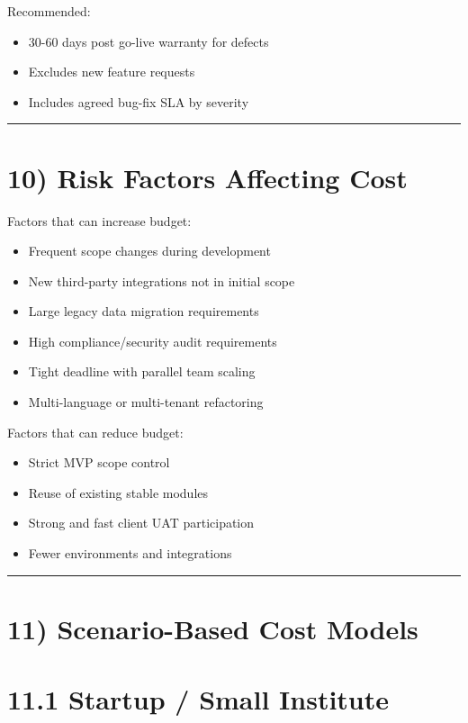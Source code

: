 \documentclass[11pt,a4paper]{article}
\begin{document}
Recommended:\\

\begin{itemize}
\item 30-60 days post go-live warranty for defects
\item Excludes new feature requests
\item Includes agreed bug-fix SLA by severity
\end{itemize}

\bigskip\hrule\bigskip

\section{10) Risk Factors Affecting Cost}

Factors that can increase budget:\\

\begin{itemize}
\item Frequent scope changes during development
\item New third-party integrations not in initial scope
\item Large legacy data migration requirements
\item High compliance/security audit requirements
\item Tight deadline with parallel team scaling
\item Multi-language or multi-tenant refactoring
\end{itemize}

Factors that can reduce budget:\\

\begin{itemize}
\item Strict MVP scope control
\item Reuse of existing stable modules
\item Strong and fast client UAT participation
\item Fewer environments and integrations
\end{itemize}

\bigskip\hrule\bigskip

\section{11) Scenario-Based Cost Models}

\section{11.1 Startup / Small Institute}
\end{document}
